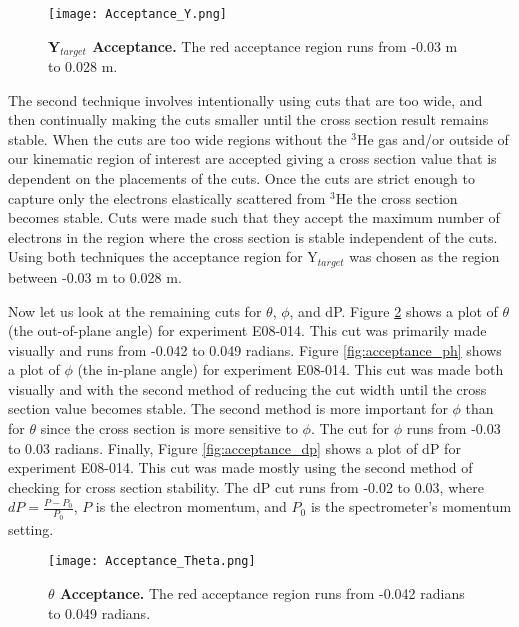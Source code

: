 \begin{figure}[!ht]
\begin{center}
\texttt{[image: Acceptance\_Y.png]}
\end{center}
\caption[Y$_{target}$ Acceptance]{
{\bf{Y$_{target}$ Acceptance.}} The red acceptance region runs from -0.03 m to 0.028 m.}
\label{fig:acceptance_y}
\end{figure}

The second technique involves intentionally using cuts that are too wide, and then continually making the cuts smaller until the cross section result remains stable. When the cuts are too wide regions without the $^3$He gas and/or outside of our kinematic region of interest are accepted giving a cross section value that is dependent on the placements of the cuts. Once the cuts are strict enough to capture only the electrons elastically scattered from $^3$He the cross section becomes stable. Cuts were made such that they accept the maximum number of electrons in the region where the cross section is stable independent of the cuts. Using both techniques the acceptance region for Y$_{target}$ was chosen as the region between -0.03 m to 0.028 m.

Now let us look at the remaining cuts for $\theta$, $\phi$, and dP. Figure \ref{fig:acceptance_th} shows a plot of $\theta$ (the out-of-plane angle) for experiment E08-014. This cut was primarily made visually and runs from -0.042 to 0.049 radians. Figure \ref{fig:acceptance_ph} shows a plot of $\phi$ (the in-plane angle) for experiment E08-014. This cut was made both visually and with the second method of reducing the cut width until the cross section value becomes stable. The second method is more important for $\phi$ than for $\theta$ since the cross section is more sensitive to $\phi$. The cut for $\phi$ runs from -0.03 to 0.03 radians. Finally, Figure \ref{fig:acceptance_dp} shows a plot of dP for experiment E08-014. This cut was made mostly using the second method of checking for cross section stability. The dP cut runs from -0.02 to 0.03, where $dP = \frac{P-P_0}{P_0}$, $P$ is the electron momentum, and $P_0$ is the spectrometer's momentum setting.

\begin{figure}[!ht]
\begin{center}
\texttt{[image: Acceptance\_Theta.png]}
\end{center}
\caption[$\theta$ Acceptance]{
{\bf{$\theta$ Acceptance.}} The red acceptance region runs from -0.042 radians to 0.049 radians.}
\label{fig:acceptance_th}
\end{figure}

